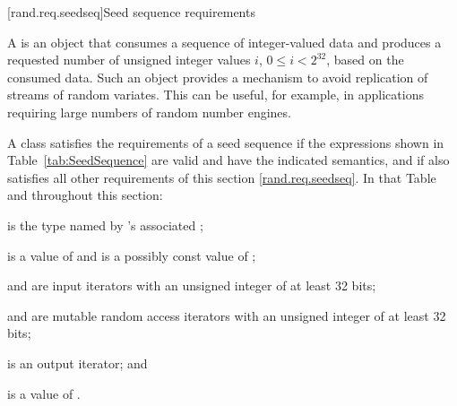 
[rand.req.seedseq]{Seed sequence requirements}%
%

\pnum
 A 
 is an object
 that consumes a sequence
 of integer-valued data
 and produces a requested number
 of unsigned integer values $i$, $ 0 \le i < 2^{32} $,
 based on the consumed data.
\enternote
 Such an object provides a mechanism
 to avoid replication of streams of random variates.
 This can be useful, for example, in applications
 requiring large numbers of random number engines.
\exitnote

\pnum
A class 
satisfies the requirements
of a seed sequence
if the expressions shown
in Table~\ref{tab:SeedSequence}
are valid and have the indicated semantics,
and if  also satisfies all other requirements
of this section \ref{rand.req.seedseq}.
In that Table and throughout this section:
\begin{enumeratea}
  \item
     is the type named by
    's associated ;
  \item
     is a value of 
    and
     is a possibly const value of ;
  \item
     and  are input iterators
    with an unsigned integer  of at least 32 bits;
  \item
     and  are mutable random access iterators
    with an unsigned integer  of at least 32 bits;
  \item
     is an output iterator;
  and
  \item
     is a value of .
\end{enumeratea}


